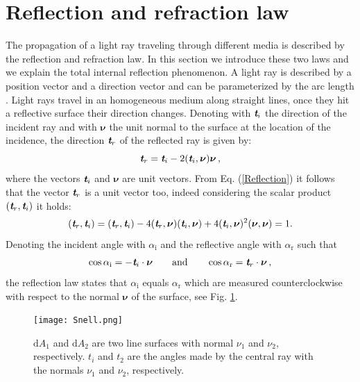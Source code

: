\section{Reflection and refraction law}
The propagation of a light ray traveling through  different media is described by the reflection and refraction law.
In this section we introduce these two laws and we explain the total internal reflection phenomenon.
A light ray is described by a position vector  and a direction vector  and can be parameterized by the arc length .
Light rays travel in an homogeneous medium along straight lines, once they hit a reflective surface their direction changes.
 Denoting with $\textit{\textbf{t}}_i$ the direction of the incident ray and with $\boldsymbol{\nu}$ the unit normal to the surface at the location of the incidence, the direction $\textit{\textbf{t}}_r$ of the reflected ray is given by:
 \begin{equation}\label{Reflection}
  \textit{\textbf{t}}_r = \textit{\textbf{t}}_i-2(\textit{\textbf{t}}_i,\boldsymbol{\nu})\boldsymbol{\nu}\,,
\end{equation}
where the vectors $\textit{\textbf{t}}_i$ and $\boldsymbol{\nu}$ are unit vectors. 
From Eq. (\ref{Reflection}) it follows that the vector  $\textit{\textbf{t}}_r$ is a unit vector too, indeed considering the scalar product $(\textit{\textbf{t}}_r,\textit{\textbf{t}}_i)$ it holds:
\begin{equation}\label{unit_vector}
(\textit{\textbf{t}}_r,\textit{\textbf{t}}_i) = (\textit{\textbf{t}}_r,\textit{\textbf{t}}_i) - 4(\textit{\textbf{t}}_r,\boldsymbol{\nu})(\textit{\textbf{t}}_i,\boldsymbol{\nu})+
4(\textit{\textbf{t}}_i,\boldsymbol{\nu})^2(\boldsymbol{\nu},\boldsymbol{\nu})=1 .
\end{equation} 
Denoting the incident angle with $\alpha_{\textrm{i}}$ and the reflective angle with $\alpha_\textrm{r}$ such that
\begin{equation}
\cos{\alpha_{\textrm{i}}} = -\textit{\textbf{t}}_i\cdot \boldsymbol{\nu} \qquad \mbox{and} \qquad \cos{\alpha_{\textrm{r}}} = \textit{\textbf{t}}_r \cdot\boldsymbol{\nu}\,,
\end{equation}
the reflection law states that $\alpha_\textrm{i}$ equals $\alpha_\textrm{r}$ which are measured counterclockwise with respect to the normal $\boldsymbol{\nu}$ of the surface, see Fig. \ref{fig:Snell}.
\begin{figure}[h]
 \label{fig:Snell}
     \begin{center}
     \texttt{[image: Snell.png]}
     \end{center}
     \caption{\footnotesize{$\textrm{d}A_1$ and $\textrm{d}A_2$ are two line surfaces with normal $\nu_1$ and $\nu_2$, respectively. $t_i$ and $t_2$ are the angles made by the central ray with the normals $\nu_1$ and $\nu_2$, respectively.}}
\label{fig:Snell}
 \end{figure}
